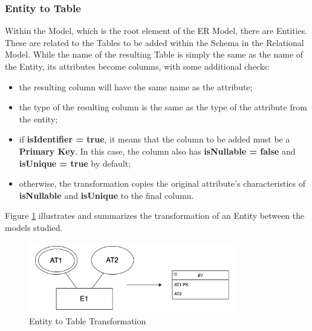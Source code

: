 \documentclass[10pt]{article}
\begin{document}
\subsubsection{Entity to Table}

Within the Model, which is the root element of the ER Model, there are Entities. These are related to the Tables to be added within the Schema in the Relational Model. While the name of the resulting Table is simply the same as the name of the Entity, its attributes become columns, with some additional checks:

\begin{itemize}

    \item the resulting column will have the same name as the attribute;
    
    \item the type of the resulting column is the same as the type of the attribute from the entity;
    
    \item if \textbf{isIdentifier = true}, it means that the column to be added must be a \textbf{Primary Key}. In this case, the column also has \textbf{isNullable = false} and \textbf{isUnique = true} by default;
    
    \item otherwise, the transformation copies the original attribute's characteristics of \textbf{isNullable} and \textbf{isUnique} to the final column.

\end{itemize}

Figure \ref{figure5} illustrates and summarizes the transformation of an Entity between the models studied.

\begin{center}
    \begin{figure}[H]
        \centering
        \includegraphics[width=0.8\textwidth]{imgs/entity-transformation.png}
            \caption{Entity to Table Transformation}
        \label{figure5}
    \end{figure}
\end{center}
\end{document}
